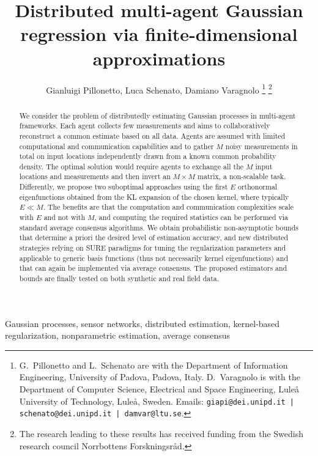 \documentclass[10pt,twocolumn,twoside]{IEEEtran}					%
\theoremstyle	{plain}
\begin{document}
\title{Distributed multi-agent Gaussian regression via finite-dimensional approximations}
\author
{
	Gianluigi Pillonetto, Luca Schenato, Damiano Varagnolo
	\thanks
	{
		G.\ Pillonetto and L.\ Schenato are with the Department of Information Engineering, University of Padova, Padova, Italy. D.\ Varagnolo is with the Department of Computer Science, Electrical and Space Engineering, Lule{\aa} University of Technology, Lule{\aa}, Sweden. Emails: {\tt giapi@dei.unipd.it | schenato@dei.unipd.it | damvar@ltu.se}. 
	}
	\thanks
	{
		The research leading to these results has received funding from the Swedish research council Norrbottens Forskningsr{\aa}d.
	}
}
\date{}
\maketitle
\IEEEoverridecommandlockouts
\IEEEpeerreviewmaketitle
\begin{abstract}
	We consider the problem of distributedly estimating Gaussian processes in multi-agent frameworks. Each agent collects few measurements and aims to collaboratively reconstruct a common estimate based on all data. Agents are assumed with limited computational and communication capabilities and to gather $M$ noisy measurements in total on input locations independently drawn from a known common probability density. The optimal solution would require agents to exchange all the $M$ input locations and measurements and then invert an $M \times M$ matrix, a non-scalable task. Differently, we propose two suboptimal approaches using the first $E$ orthonormal eigenfunctions obtained from the \ac{KL} expansion of the chosen kernel, where typically $E\ll M$. The benefits are that the computation and communication complexities scale with $E$ and not with $M$, and computing the required statistics can be performed via standard average consensus algorithms. We obtain probabilistic non-asymptotic bounds that determine a priori the desired level of estimation accuracy, and new distributed strategies relying on \ac{SURE} paradigms for tuning the regularization parameters and applicable to generic basis functions (thus not necessarily kernel eigenfunctions) and that can again be implemented via average consensus. The proposed estimators and bounds are finally tested on both synthetic and real field data.
\end{abstract}
\begin{IEEEkeywords}
	Gaussian processes, sensor networks, distributed estimation, kernel-based regularization, nonparametric estimation, average consensus
\end{IEEEkeywords}
\end{document}
